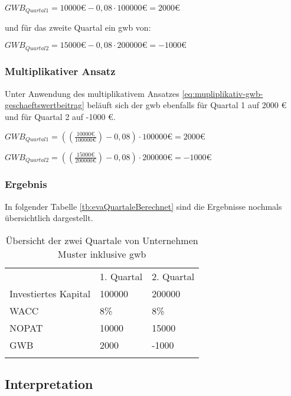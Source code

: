 \bigskip
$GWB_{Quartal 1} = 10000 \text{€} - 0,08 \cdot 100000 \text{€} = 2000 \text{€}$

\bigskip
\noindent
und für das zweite Quartal ein \ac{gwb} von:

\bigskip
$GWB_{Quartal 2} = 15000 \text{€} - 0,08 \cdot 200000 \text{€} = -1000 \text{€}$

\subsubsection{Multiplikativer Ansatz}

Unter Anwendung des multiplikativem Ansatzes \eqref{eq:mupliplikativ-gwb-geschaeftswertbeitrag} beläuft sich der \ac{gwb} ebenfalls für Quartal 1 auf 2000 € und für Quartal 2 auf -1000 €.

\bigskip
$GWB_{Quartal 1} = ((\frac{10000 \text{€}}{100000 \text{€}}) - 0,08) \cdot 100000 \text{€} = 2000 \text{€}$

\bigskip
$GWB_{Quartal 2} = ((\frac{15000 \text{€}}{200000 \text{€}}) - 0,08) \cdot 200000 \text{€} = -1000 \text{€}$


\subsubsection{Ergebnis}

In folgender Tabelle \eqref{tb:evaQuartaleBerechnet} sind die Ergebnisse nochmals übersichtlich dargestellt.

\begin{table}[!h]
    \begin{tabular}{lll}
        \cline{1-3} \rowcolor{gray}
                             & 1. Quartal & 2. Quartal \\ \cline{1-3} \rowcolor{white}
        Investiertes Kapital & 100000     & 200000     \\ \cline{1-3} \rowcolor{white}
        WACC                 & 8\%        & 8\%        \\ \cline{1-3} \rowcolor{white}
        NOPAT                & 10000      & 15000      \\ \hline \rowcolor{white}
        GWB                  & 2000       & -1000      \\ \cline{1-3} \rowcolor{white}
    \end{tabular}
    \caption{Übersicht der zwei Quartale von Unternehmen Muster inklusive \ac{gwb}}
    \label{tb:evaQuartaleBerechnet}
\end{table}

\subsection{Interpretation}


